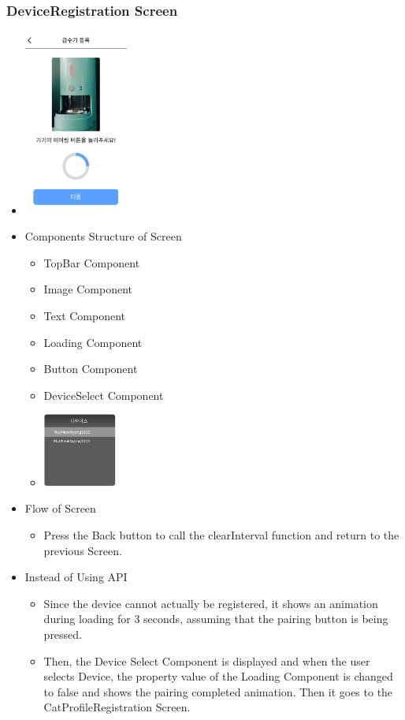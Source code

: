 \documentclass[conference]{IEEEtran}
\begin{document}
\subsubsection{DeviceRegistration Screen}
\begin{itemize}
    \item[] \includegraphics[width=0.27\textwidth]{img/D/10.png}
    \item Components Structure of Screen
    \begin{itemize}
        \item TopBar Component
        \item Image Component
        \item Text Component
        \item Loading Component
        \item Button Component
        \item DeviceSelect Component
        \item[] \includegraphics[width=0.2\textwidth]{img/D/10-1.png}
    \end{itemize}
    \item Flow of Screen
    \begin{itemize}
        \item Press the Back button to call the clearInterval function and return to the previous Screen.
    \end{itemize}
    \item Instead of Using API
    \begin{itemize}
        \item Since the device cannot actually be registered, it shows an animation during loading for 3 seconds, assuming that the pairing button is being pressed.
        \item Then, the Device Select Component is displayed and when the user selects Device, the property value of the Loading Component is changed to false and shows the pairing completed animation. Then it goes to the CatProfileRegistration Screen.
    \end{itemize}
\end{itemize}
\newpage
\end{document}
